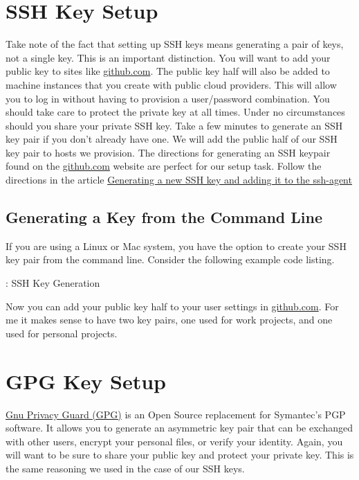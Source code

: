 \section{SSH Key Setup}

\justify{}
Take note of the fact that setting up SSH keys means generating a pair of keys, not a single key. This is an important 
distinction. You will want to add your public key to sites like \href{github.com}{github.com}. The public key half will
also be added to machine instances that you create with public cloud providers. This will allow you to log in without
having to provision a user/password combination. You should take care to 
protect the private key at all times. Under no circumstances should you share your private SSH key.\cite{ssh}
\justify{}
Take a few minutes to generate an SSH key pair if you don't already have one. We will add the public half of
our SSH key pair to hosts we provision. The directions for generating an SSH keypair found on the
\href{github.com}{github.com} website are perfect for our setup task. Follow the directions in the article 
\href{https://docs.github.com/en/github/authenticating-to-github/connecting-to-github-with-ssh/generating-a-new-ssh-key-and-adding-it-to-the-ssh-agent}{Generating a new SSH key and adding it to the ssh-agent}

\subsection{Generating a Key from the Command Line}

If you are using a Linux or Mac system, you have the option to create your SSH key pair from the command line. Consider 
the following example code listing.

\begin{mybox}{\thetcbcounter: SSH Key Generation}

\end{mybox}

\justify{}
Now you can add your public key half to your user settings in \href{github.com}{github.com}. For me it makes sense to have
two key pairs, one used for work projects, and one used for personal projects.

\section{GPG Key Setup}

\justify{}
\href{https://gnupg.org/}{Gnu Privacy Guard (GPG)} is an Open Source replacement for Symantec's PGP software. It allows you
to generate an asymmetric key pair that can be exchanged with other users, encrypt your personal files, or verify your identity.
Again, you will want to be sure to share your public key and protect your private key. This is the same reasoning we used in the
case of our SSH keys.

